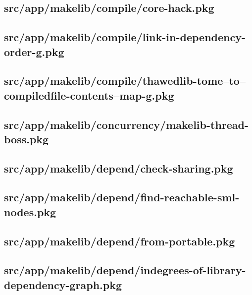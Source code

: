 \subsection{src/app/makelib/compile/core-hack.pkg}


\subsection{src/app/makelib/compile/link-in-dependency-order-g.pkg}


\subsection{src/app/makelib/compile/thawedlib-tome--to--compiledfile-contents--map-g.pkg}


\subsection{src/app/makelib/concurrency/makelib-thread-boss.pkg}


\subsection{src/app/makelib/depend/check-sharing.pkg}


\subsection{src/app/makelib/depend/find-reachable-sml-nodes.pkg}


\subsection{src/app/makelib/depend/from-portable.pkg}


\subsection{src/app/makelib/depend/indegrees-of-library-dependency-graph.pkg}


